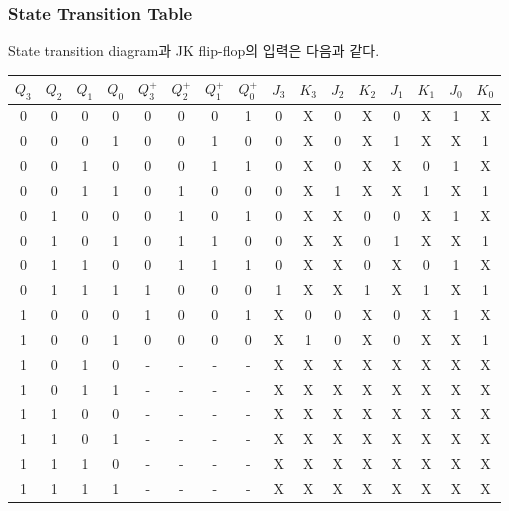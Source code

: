 \documentclass{scrartcl}
\begin{document}
\subsubsection{State Transition Table}
State transition diagram과 JK flip-flop의 입력은 다음과 같다.
\begin{table}[H]
  \centering
  \begin{tabular}{cccc|cccc|cc|cc|cc|cc}
    \hline
    \(Q_3\) & \(Q_2\) & \(Q_1\) & \(Q_0\) & \(Q^+_3\) & \(Q^+_2\) & \(Q^+_1\) & \(Q^+_0\) & \(J_3\) & \(K_3\) & \(J_2\) & \(K_2\) & \(J_1\) & \(K_1\) & \(J_0\) & \(K_0\) \\
    \hline
    0 & 0 & 0 & 0 & 0 & 0 & 0 & 1 & 0 & X & 0 & X & 0 & X & 1 & X \\
    0 & 0 & 0 & 1 & 0 & 0 & 1 & 0 & 0 & X & 0 & X & 1 & X & X & 1 \\
    0 & 0 & 1 & 0 & 0 & 0 & 1 & 1 & 0 & X & 0 & X & X & 0 & 1 & X \\
    0 & 0 & 1 & 1 & 0 & 1 & 0 & 0 & 0 & X & 1 & X & X & 1 & X & 1 \\
    0 & 1 & 0 & 0 & 0 & 1 & 0 & 1 & 0 & X & X & 0 & 0 & X & 1 & X \\
    0 & 1 & 0 & 1 & 0 & 1 & 1 & 0 & 0 & X & X & 0 & 1 & X & X & 1 \\
    0 & 1 & 1 & 0 & 0 & 1 & 1 & 1 & 0 & X & X & 0 & X & 0 & 1 & X \\
    0 & 1 & 1 & 1 & 1 & 0 & 0 & 0 & 1 & X & X & 1 & X & 1 & X & 1 \\
    1 & 0 & 0 & 0 & 1 & 0 & 0 & 1 & X & 0 & 0 & X & 0 & X & 1 & X \\
    1 & 0 & 0 & 1 & 0 & 0 & 0 & 0 & X & 1 & 0 & X & 0 & X & X & 1 \\
    1 & 0 & 1 & 0 & - & - & - & - & X & X & X & X & X & X & X & X \\
    1 & 0 & 1 & 1 & - & - & - & - & X & X & X & X & X & X & X & X \\
    1 & 1 & 0 & 0 & - & - & - & - & X & X & X & X & X & X & X & X \\
    1 & 1 & 0 & 1 & - & - & - & - & X & X & X & X & X & X & X & X \\
    1 & 1 & 1 & 0 & - & - & - & - & X & X & X & X & X & X & X & X \\
    1 & 1 & 1 & 1 & - & - & - & - & X & X & X & X & X & X & X & X \\
    \hline
  \end{tabular}
\end{table}
\end{document}
